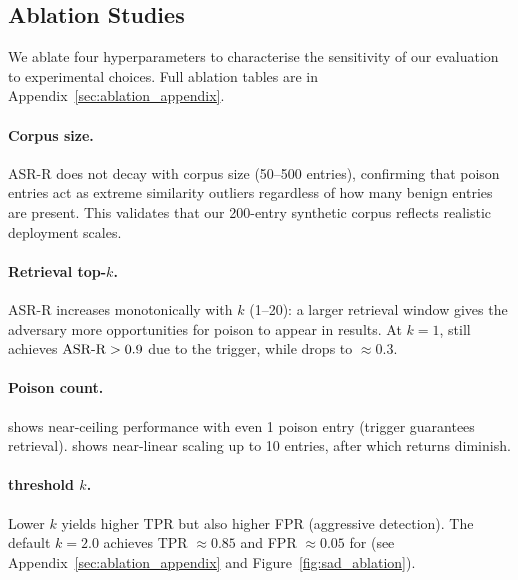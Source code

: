 \subsection{Ablation Studies}
\label{sec:ablation}

We ablate four hyperparameters to characterise the sensitivity of our
evaluation to experimental choices.  Full ablation tables are in
Appendix~\ref{sec:ablation_appendix}.

\paragraph{Corpus size.}
ASR-R does not decay with corpus size (50--500 entries), confirming that
poison entries act as extreme similarity outliers regardless of how many
benign entries are present.  This validates that our 200-entry synthetic
corpus reflects realistic deployment scales.

\paragraph{Retrieval top-\texorpdfstring{$k$}{k}.}
ASR-R increases monotonically with $k$ (1--20): a larger retrieval window
gives the adversary more opportunities for poison to appear in results.
At $k=1$, \agentpoison{} still achieves $\text{ASR-R} > 0.9$ due to the trigger,
while \injecmem{} drops to $\approx 0.3$.

\paragraph{Poison count.}
\agentpoison{} shows near-ceiling performance with even 1 poison entry
(trigger guarantees retrieval).  \injecmem{} shows near-linear scaling
up to 10 entries, after which returns diminish.

\paragraph{\sad{} threshold \texorpdfstring{$k$}{k}.}
Lower $k$ yields higher TPR but also higher FPR (aggressive detection).
The default $k=2.0$ achieves TPR $\approx 0.85$ and FPR $\approx 0.05$
for \agentpoison{} (see Appendix~\ref{sec:ablation_appendix} and
Figure~\ref{fig:sad_ablation}).

